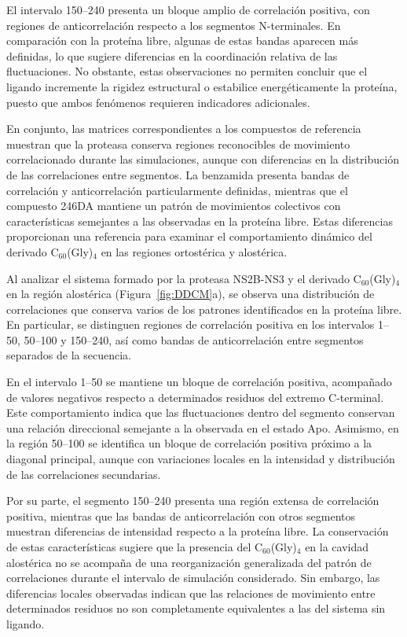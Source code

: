 El intervalo 150--240 presenta un bloque amplio de correlación positiva, con regiones de anticorrelación respecto a los segmentos N-terminales. En comparación con la proteína libre, algunas de estas bandas aparecen más definidas, lo que sugiere diferencias en la coordinación relativa de las fluctuaciones. No obstante, estas observaciones no permiten concluir que el ligando incremente la rigidez estructural o estabilice energéticamente la proteína, puesto que ambos fenómenos requieren indicadores adicionales.

En conjunto, las matrices correspondientes a los compuestos de referencia muestran que la proteasa conserva regiones reconocibles de movimiento correlacionado durante las simulaciones, aunque con diferencias en la distribución de las correlaciones entre segmentos. La benzamida presenta bandas de correlación y anticorrelación particularmente definidas, mientras que el compuesto 246DA mantiene un patrón de movimientos colectivos con características semejantes a las observadas en la proteína libre. Estas diferencias proporcionan una referencia para examinar el comportamiento dinámico del derivado C$_{60}$(Gly)$_4$ en las regiones ortostérica y alostérica.

Al analizar el sistema formado por la proteasa NS2B-NS3 y el derivado C$_{60}$(Gly)$_4$ en la región alostérica (Figura~\ref{fig:DDCM}a), se observa una distribución de correlaciones que conserva varios de los patrones identificados en la proteína libre. En particular, se distinguen regiones de correlación positiva en los intervalos 1--50, 50--100 y 150--240, así como bandas de anticorrelación entre segmentos separados de la secuencia.

En el intervalo 1--50 se mantiene un bloque de correlación positiva, acompañado de valores negativos respecto a determinados residuos del extremo C-terminal. Este comportamiento indica que las fluctuaciones dentro del segmento conservan una relación direccional semejante a la observada en el estado Apo. Asimismo, en la región 50--100 se identifica un bloque de correlación positiva próximo a la diagonal principal, aunque con variaciones locales en la intensidad y distribución de las correlaciones secundarias.

Por su parte, el segmento 150--240 presenta una región extensa de correlación positiva, mientras que las bandas de anticorrelación con otros segmentos muestran diferencias de intensidad respecto a la proteína libre. La conservación de estas características sugiere que la presencia del C$_{60}$(Gly)$_4$ en la cavidad alostérica no se acompaña de una reorganización generalizada del patrón de correlaciones durante el intervalo de simulación considerado. Sin embargo, las diferencias locales observadas indican que las relaciones de movimiento entre determinados residuos no son completamente equivalentes a las del sistema sin ligando.

